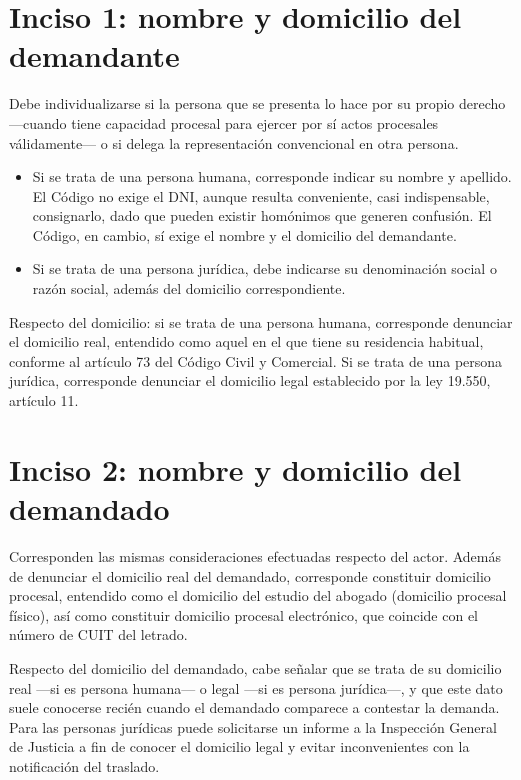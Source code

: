 \documentclass[12pt,oneside]{book}
\begin{document}
\section{Inciso 1: nombre y domicilio del demandante}

Debe individualizarse si la persona que se presenta lo hace por su propio derecho —cuando tiene capacidad procesal para ejercer por sí actos procesales válidamente— o si delega la representación convencional en otra persona.

\begin{itemize}
    \item Si se trata de una persona humana, corresponde indicar su nombre y apellido. El Código no exige el DNI, aunque resulta conveniente, casi indispensable, consignarlo, dado que pueden existir homónimos que generen confusión. El Código, en cambio, sí exige el nombre y el domicilio del demandante.
    \item Si se trata de una persona jurídica, debe indicarse su denominación social o razón social, además del domicilio correspondiente.
\end{itemize}

Respecto del domicilio: si se trata de una persona humana, corresponde denunciar el domicilio real, entendido como aquel en el que tiene su residencia habitual, conforme al artículo 73 del Código Civil y Comercial. Si se trata de una persona jurídica, corresponde denunciar el domicilio legal establecido por la ley 19.550, artículo 11.

\section{Inciso 2: nombre y domicilio del demandado}

Corresponden las mismas consideraciones efectuadas respecto del actor. Además de denunciar el domicilio real del demandado, corresponde constituir domicilio procesal, entendido como el domicilio del estudio del abogado (domicilio procesal físico), así como constituir domicilio procesal electrónico, que coincide con el número de CUIT del letrado.

Respecto del domicilio del demandado, cabe señalar que se trata de su domicilio real —si es persona humana— o legal —si es persona jurídica—, y que este dato suele conocerse recién cuando el demandado comparece a contestar la demanda. Para las personas jurídicas puede solicitarse un informe a la Inspección General de Justicia a fin de conocer el domicilio legal y evitar inconvenientes con la notificación del traslado.
\end{document}
